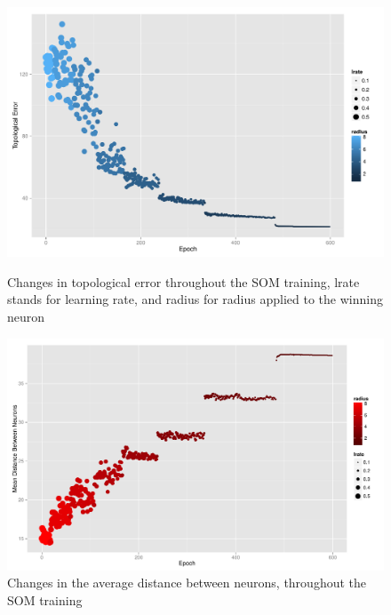 \begin{figure}[h]
  \includegraphics[scale=0.6]{./plots/som/topological_error.pdf}
  \label{fig:top_error}
  \caption{Changes in topological error throughout the SOM training, lrate stands for learning rate, and radius for radius applied to the winning neuron}
\end{figure}

\begin{figure}[h]
  \centerline{\includegraphics[scale=0.6]{./plots/som/average_distance.pdf}}
  \label{fig:avg_dist}
  \caption{Changes in the average distance between neurons, throughout the SOM training}
\end{figure}

